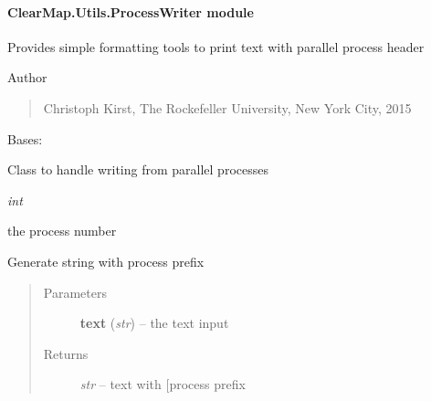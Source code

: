 \documentclass[letterpaper,10pt,english]{sphinxmanual}
\begin{document}
\paragraph{ClearMap.Utils.ProcessWriter module}
\label{api/ClearMap.Utils:module-ClearMap.Utils.ProcessWriter}\label{api/ClearMap.Utils:clearmap-utils-processwriter-module}
Provides simple formatting tools to print text with parallel process header

Author
\begin{quote}

Christoph Kirst, The Rockefeller University, New York City, 2015
\end{quote}

\begin{fulllineitems}
\label{api/ClearMap.Utils:ClearMap.Utils.ProcessWriter.ProcessWriter}
Bases: 

Class to handle writing from parallel processes

\begin{fulllineitems}
\label{api/ClearMap.Utils:ClearMap.Utils.ProcessWriter.ProcessWriter.process}
\emph{int}

the process number

\end{fulllineitems}


\begin{fulllineitems}
\label{api/ClearMap.Utils:ClearMap.Utils.ProcessWriter.ProcessWriter.writeString}
Generate string with process prefix
\begin{quote}\begin{description}
\item[{Parameters}] \leavevmode
\textbf{text} (\emph{str}) --
the text input

\item[{Returns}] \leavevmode
\emph{str} --
text with {[}process prefix

\end{description}\end{quote}

\end{fulllineitems}


\end{fulllineitems}
\end{document}
